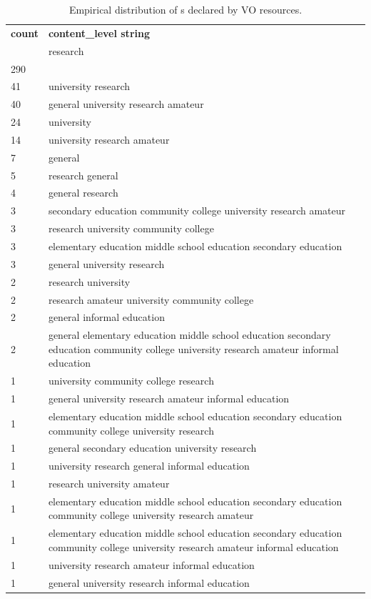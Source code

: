 \documentclass{ivoa}
\begin{document}
\begin{table}
\begin{tabular}{lp{12cm}}
\sptablerule
\textbf{count}&
\textbf{content\_level string}\\
\sptablerule
13937&research\\
290&\\
41&university research\\
40&general university research amateur\\
24&university\\
14&university research amateur\\
7&general\\
5&research general\\
4&general research\\
3&secondary education community college university research amateur\\
3&research university community college\\
3&elementary education middle school education secondary education\\
3&general university research\\
2&research university\\
2&research amateur university community college\\
2&general informal education\\
2&general elementary education middle school education secondary education community college university research amateur informal education\\
1&university community college research\\
1&general university research amateur informal education\\
1&elementary education middle school education secondary education community college university research\\
1&general secondary education university research\\
1&university research general informal education\\
1&research university amateur\\
1&elementary education middle school education secondary education community college university research amateur\\
1&elementary education middle school education secondary education community college university research amateur informal education\\
1&university research amateur informal education\\
1&general university research informal education\\
\end{tabular}
\caption{Empirical distribution of s declared by VO
resources.}
\label{tab:cldist}
\end{table}
\end{document}
